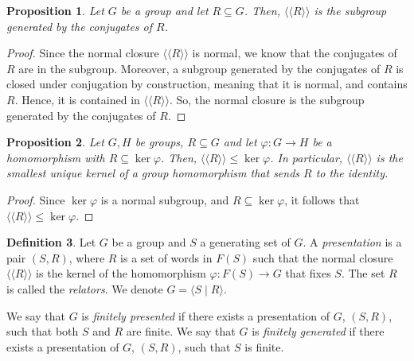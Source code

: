 \documentclass[a4paper, openany]{memoir}
\theoremstyle{definition}
\newtheorem{definition}{Definition}[section]
\theoremstyle{plain}
\newtheorem{proposition}[definition]{Proposition}
\begin{document}
    \begin{proposition}
        Let $G$ be a group and let $R \subseteq G$. Then, $\langle \langle R \rangle \rangle$ is the subgroup generated by the conjugates of $R$.
    \end{proposition}
    \begin{proof}
        Since the normal closure $\langle \langle R \rangle \rangle$ is normal, we know that the conjugates of $R$ are in the subgroup. Moreover, a subgroup generated by the conjugates of $R$ is closed under conjugation by construction, meaning that it is normal, and contains $R$. Hence, it is contained in $\langle\langle R \rangle\rangle$. So, the normal closure is the subgroup generated by the conjugates of $R$.
    \end{proof}

    \begin{proposition}
        Let $G, H$ be groups, $R \subseteq G$ and let $\varphi \colon G \to H$ be a homomorphism with $R \subseteq \ker \varphi$. Then, $\langle \langle R \rangle \rangle \leq \ker \varphi$. In particular, $\langle \langle R \rangle \rangle$ is the smallest unique kernel of a group homomorphism that sends $R$ to the identity.
    \end{proposition}
    \begin{proof}
        Since $\ker \varphi$ is a normal subgroup, and $R \subseteq \ker \varphi$, it follows that $\langle \langle R \rangle \rangle \leq \ker \varphi$.
    \end{proof}

    \begin{definition}
        Let $G$ be a group and $S$ a generating set of $G$. A \emph{presentation} is a pair $(S, R)$, where $R$ is a set of words in $F(S)$ such that the normal closure $\langle \langle R \rangle \rangle$ is the kernel of the homomorphism $\varphi \colon F(S) \to G$ that fixes $S$. The set $R$ is called the \emph{relators}. We denote $G = \langle S \mid R \rangle$. 
        
        We say that $G$ is \emph{finitely presented} if there exists a presentation of $G$, $(S, R)$, such that both $S$ and $R$ are finite. We say that $G$ is \emph{finitely generated} if there exists a presentation of $G$, $(S, R)$, such that $S$ is finite.
    \end{definition}
\end{document}
